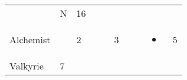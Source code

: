 \documentclass[12pt]{article}
\begin{document}
\begin{longtable}[]{@{}llllllllll@{}}
\begin{minipage}[t]{0.06\columnwidth}
\strut\end{minipage} &
\begin{minipage}[t]{0.07\columnwidth}\raggedright\strut
N
\strut\end{minipage} &
\begin{minipage}[t]{0.08\columnwidth}\raggedright\strut
16
\strut\end{minipage}\tabularnewline
\begin{minipage}[t]{0.13\columnwidth}\raggedright\strut
Alchemist
\strut\end{minipage} &
\begin{minipage}[t]{0.06\columnwidth}\raggedright\strut
\strut\end{minipage} &
\begin{minipage}[t]{0.06\columnwidth}\raggedright\strut
2
\strut\end{minipage} &
\begin{minipage}[t]{0.06\columnwidth}\raggedright\strut
\strut\end{minipage} &
\begin{minipage}[t]{0.06\columnwidth}\raggedright\strut
\strut\end{minipage} &
\begin{minipage}[t]{0.06\columnwidth}\raggedright\strut
3
\strut\end{minipage} &
\begin{minipage}[t]{0.06\columnwidth}\raggedright\strut
\strut\end{minipage} &
\begin{minipage}[t]{0.06\columnwidth}\raggedright\strut
\strut\end{minipage} &
\begin{minipage}[t]{0.07\columnwidth}\raggedright\strut
\begin{itemize}
\item
\end{itemize}
\strut\end{minipage} &
\begin{minipage}[t]{0.08\columnwidth}\raggedright\strut
5
\strut\end{minipage}\tabularnewline
\begin{minipage}[t]{0.13\columnwidth}\raggedright\strut
Valkyrie
\strut\end{minipage} &
\begin{minipage}[t]{0.06\columnwidth}\raggedright\strut
7
\strut\end{minipage} &
\begin{minipage}[t]{0.06\columnwidth}\raggedright\strut
\strut\end{minipage} &

\end{longtable}
\end{document}
